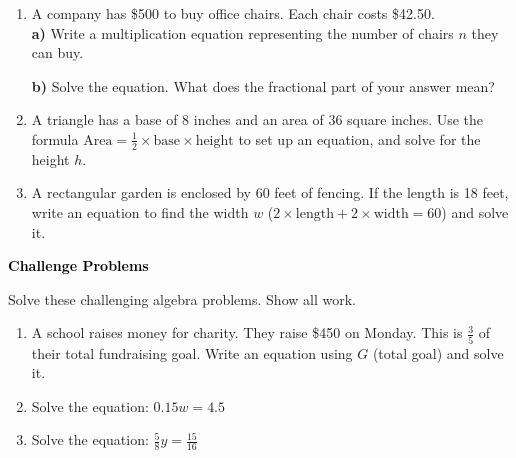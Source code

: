 \documentclass[12pt, letterpaper, fleqn]{article}
\begin{document}
\begin{enumerate}[itemsep=2.2cm, leftmargin=0.6cm]

\item A company has \$500 to buy office chairs. Each chair costs \$42.50. \\
\textbf{a)} Write a multiplication equation representing the number of chairs $n$ they can buy. \\
\vspace{1cm}

\textbf{b)} Solve the equation. What does the fractional part of your answer mean?

\vspace{1cm}

\item A triangle has a base of 8 inches and an area of 36 square inches. Use the formula $\text{Area} = \frac{1}{2} \times \text{base} \times \text{height}$ to set up an equation, and solve for the height $h$.

\vspace{2cm}

\item A rectangular garden is enclosed by 60 feet of fencing. If the length is 18 feet, write an equation to find the width $w$ ($2 \times \text{length} + 2 \times \text{width} = 60$) and solve it.

\vspace{2cm}

\end{enumerate}

\newpage

\begin{tcolorbox}[colback=black!10]
\large\textcolor{black}{\textbf{Challenge Problems}}
\end{tcolorbox}

\noindent
Solve these challenging algebra problems. Show all work.

\vspace{3mm}

\begin{enumerate}[itemsep=2.4cm, leftmargin=0.6cm]

\item A school raises money for charity. They raise \$450 on Monday. This is $\frac{3}{5}$ of their total fundraising goal. Write an equation using $G$ (total goal) and solve it.

\vspace{2.3cm}

\item Solve the equation: $0.15w = 4.5$

\vspace{2.3cm}

\item Solve the equation: $\frac{5}{8}y = \frac{15}{16}$

\vspace{2.5cm}

\end{enumerate}
\end{document}
